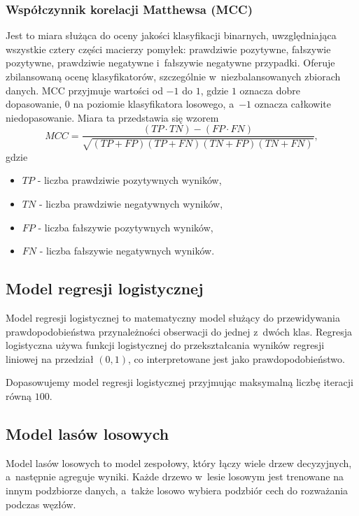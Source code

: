 \documentclass[12pt]{article}
\begin{document}
	\subsubsection{Współczynnik korelacji Matthewsa (MCC)}
	Jest to miara służąca do oceny jakości klasyfikacji binarnych, uwzględniająca wszystkie cztery części macierzy pomyłek: prawdziwie pozytywne, fałszywie pozytywne, prawdziwie negatywne i~fałszywie negatywne przypadki. Oferuje zbilansowaną ocenę klasyfikatorów, szczególnie w~niezbalansowanych zbiorach danych. MCC przyjmuje wartości od $-1$ do $1$, gdzie $1$ oznacza dobre dopasowanie, $0$ na poziomie klasyfikatora losowego, a~$-1$ oznacza całkowite niedopasowanie. Miara ta przedstawia się wzorem
	\[MCC = \frac{(TP \cdot TN) - (FP \cdot FN)}{\sqrt{(TP + FP)(TP + FN)(TN + FP)(TN + FN)}},\] 
	gdzie
	\begin{itemize}
		\item $TP$ - liczba prawdziwie pozytywnych wyników,
		\item $TN$ - liczba prawdziwie negatywnych wyników,
		\item $FP$ - liczba fałszywie pozytywnych wyników,
		\item $FN$ - liczba fałszywie negatywnych wyników.
	\end{itemize}
	
	\subsection{Model regresji logistycznej}\label{subsec:model-regresji-logistycznej}
	Model regresji logistycznej to matematyczny model służący do przewidywania prawdopodobieństwa przynależności obserwacji do jednej z~dwóch klas. Regresja logistyczna używa funkcji logistycznej do przekształcania wyników regresji liniowej na przedział $(0,1)$, co interpretowane jest jako prawdopodobieństwo.
	
	\vspace{0.25cm}
	
	Dopasowujemy model regresji logistycznej przyjmując maksymalną liczbę iteracji równą $100$.
	
	\subsection{Model lasów losowych}\label{subsec:model-lasów-losowych}
	Model lasów losowych to model zespołowy, który łączy wiele drzew decyzyjnych, a~następnie agreguje wyniki. Każde drzewo w~lesie losowym jest trenowane na innym podzbiorze danych, a~także losowo wybiera podzbiór cech do rozważania podczas węzłów. 
	
\end{document}
